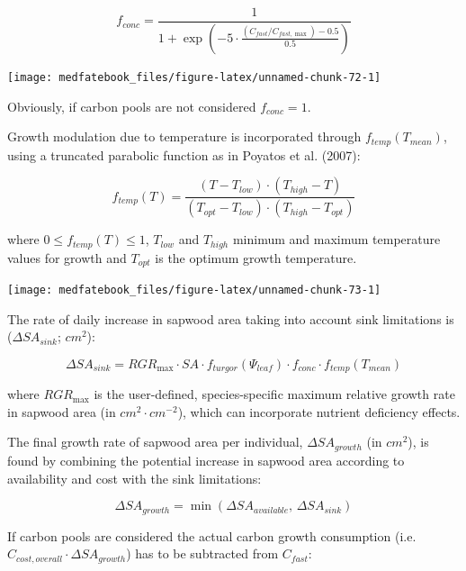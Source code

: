 \documentclass[]{book}
\begin{document}
\begin{equation}
f_{conc} = \frac{1}{1+\exp \left(-5 \cdot \frac{(C_{fast}/C_{fast, \max})-0.5}{0.5}\right)}
\end{equation}

\begin{center}\texttt{[image: medfatebook\_files/figure-latex/unnamed-chunk-72-1]} \end{center}

Obviously, if carbon pools are not considered \(f_{conc} = 1\).

Growth modulation due to temperature is incorporated through
\(f_{temp}(T_{mean})\), using a truncated parabolic function as in
Poyatos et al. (2007):

\begin{equation}
f_{temp}(T) = \frac{(T-T_{low}) \cdot (T_{high}-T)}{(T_{opt}-T_{low}) \cdot (T_{high}-T_{opt})}
\end{equation}

where \(0 \leq f_{temp}(T) \leq 1\), \(T_{low}\) and \(T_{high}\)
minimum and maximum temperature values for growth and \(T_{opt}\) is the
optimum growth temperature.

\begin{center}\texttt{[image: medfatebook\_files/figure-latex/unnamed-chunk-73-1]} \end{center}

The rate of daily increase in sapwood area taking into account sink
limitations is (\(\Delta SA_{sink}\); \(cm^2\)):

\begin{equation}
\Delta SA_{sink} = RGR_{\max} \cdot SA \cdot f_{turgor}(\Psi_{leaf}) \cdot f_{conc} \cdot f_{temp}(T_{mean})
\end{equation}

where \(RGR_{\max}\) is the user-defined, species-specific maximum
relative growth rate in sapwood area (in \(cm^2·cm^{-2}\)), which can
incorporate nutrient deficiency effects.

The final growth rate of sapwood area per individual,
\(\Delta SA_{growth}\) (in \(cm^2\)), is found by combining the
potential increase in sapwood area according to availability and cost
with the sink limitations:

\begin{equation}
\Delta SA_{growth} = \min(\Delta SA_{available}, \, \Delta SA_{sink})
\end{equation}

If carbon pools are considered the actual carbon growth consumption
(i.e. \(C_{cost,overall} \cdot \Delta SA_{growth}\)) has to be
subtracted from \(C_{fast}\):
\end{document}
